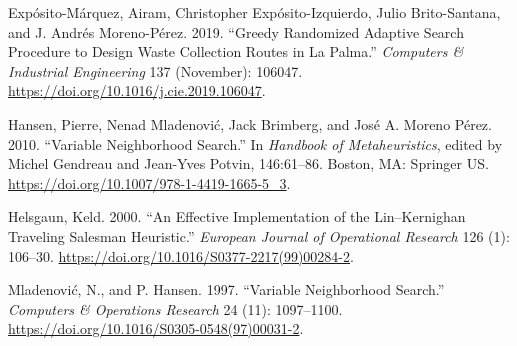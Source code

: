 \documentclass[
]{article}
\begin{document}
\hypertarget{refs}{}
\leavevmode\hypertarget{ref-exposito-marquez_greedy_2019}{}%
Expósito-Márquez, Airam, Christopher Expósito-Izquierdo, Julio
Brito-Santana, and J. Andrés Moreno-Pérez. 2019. ``Greedy Randomized
Adaptive Search Procedure to Design Waste Collection Routes in La
Palma.'' \emph{Computers \& Industrial Engineering} 137 (November):
106047. \url{https://doi.org/10.1016/j.cie.2019.106047}.

\leavevmode\hypertarget{ref-gendreau_variable_2010}{}%
Hansen, Pierre, Nenad Mladenović, Jack Brimberg, and José A. Moreno
Pérez. 2010. ``Variable Neighborhood Search.'' In \emph{Handbook of
Metaheuristics}, edited by Michel Gendreau and Jean-Yves Potvin,
146:61--86. Boston, MA: Springer US.
\url{https://doi.org/10.1007/978-1-4419-1665-5_3}.

\leavevmode\hypertarget{ref-helsgaun_effective_2000}{}%
Helsgaun, Keld. 2000. ``An Effective Implementation of the
Lin--Kernighan Traveling Salesman Heuristic.'' \emph{European Journal of
Operational Research} 126 (1): 106--30.
\url{https://doi.org/10.1016/S0377-2217(99)00284-2}.

\leavevmode\hypertarget{ref-mladenovic_variable_1997}{}%
Mladenović, N., and P. Hansen. 1997. ``Variable Neighborhood Search.''
\emph{Computers \& Operations Research} 24 (11): 1097--1100.
\url{https://doi.org/10.1016/S0305-0548(97)00031-2}.
\end{document}
